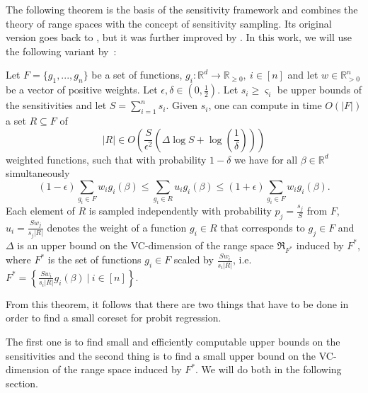 The following theorem is the basis of the sensitivity framework and
combines the theory of range spaces with the concept of
sensitivity sampling. Its original version goes back to
\cite{feldman-langberg-coresets}, but it was
further improved by
\cite{braverman-feldman-coresets}.
In this work, we will use the following variant by~\cite{big-data-tiny-data}:

\begin{theorem}
    \label{theorem:sensitivity-framework}
    Let $F = \{ g_1, ..., g_n \}$ be a set of functions,
    $g_i: \mathbb{R}^d \rightarrow \mathbb{R}_{\geq 0}, \ i \in [n]$
    and let $w \in \mathbb{R}^n_{>0}$ be a vector of positive weights.
    Let $\epsilon, \delta \in (0, \frac{1}{2})$.
    Let $s_i \geq \varsigma_i$ be upper bounds of the sensitivities and
    let $S = \sum_{i=1}^n s_i$.
    Given $s_i$, one can compute in time $O(|F|)$ a set
    $R \subseteq F$ of
    \begin{equation*}
        |R| \in O \left( \frac{S}{\epsilon^2} \left( \Delta \log S + \log \left( \frac{1}{\delta} \right) \right) \right)
    \end{equation*}
    weighted functions, such that with probability $1 - \delta$ we have
    for all $\beta \in \mathbb{R}^d$ simultaneously
    \begin{equation*}
        (1-\epsilon) \sum_{g_i \in F} w_i g_i(\beta) \leq \sum_{g_i \in R} u_i g_i(\beta) \leq (1 + \epsilon) \sum_{g_i \in F} w_i g_i(\beta).
    \end{equation*}
    Each element of $R$ is sampled independently with probability
    $p_j = \frac{s_j}{S}$ from $F$, $u_i = \frac{S w_j}{s_j |R|}$
    denotes the weight of a function $g_i \in R$ that corresponds to
    $g_j \in F$ and $\Delta$ is an upper bound on the
    VC-dimension of the range space $\mathfrak{R}_{F^\ast}$ induced by
    $F^\ast$, where $F^\ast$ is the set of functions $g_i \in F$
    scaled by $\frac{S w_i}{s_i |R|}$, i.e.
    $F^\ast = \left\{ \frac{S w_i}{s_i |R|} g_i(\beta) \ |\ i \in [n] \right\}$.
\end{theorem}

From this theorem, it follows that there are two things that have to be
done in order to find a small coreset for probit regression.

The first one is to find small and efficiently computable upper bounds
on the sensitivities and the second thing is to find a
small upper bound on the VC-dimension of the range space induced by $F^\ast$.
We will do both in the following section.
